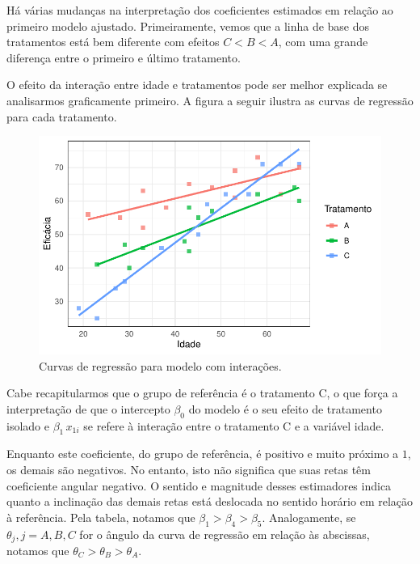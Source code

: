 \documentclass[
  letterpaper,
  DIV=11,
  numbers=noendperiod]{scrartcl}
\begin{document}
Há várias mudanças na interpretação dos coeficientes estimados em
relação ao primeiro modelo ajustado. Primeiramente, vemos que a linha de
base dos tratamentos está bem diferente com efeitos \(C<B<A\), com uma
grande diferença entre o primeiro e último tratamento.

O efeito da interação entre idade e tratamentos pode ser melhor
explicada se analisarmos graficamente primeiro. A figura a seguir
ilustra as curvas de regressão para cada tratamento.

\begin{figure}

{\centering \includegraphics{lista2_files/figure-pdf/unnamed-chunk-1-1.pdf}

}

\caption{Curvas de regressão para modelo com interações.}

\end{figure}

Cabe recapitularmos que o grupo de referência é o tratamento C, o que
força a interpretação de que o intercepto \(\beta_0\) do modelo é o seu
efeito de tratamento isolado e \(\beta_1 \, x_{1i}\) se refere à
interação entre o tratamento C e a variável idade.

Enquanto este coeficiente, do grupo de referência, é positivo e muito
próximo a \(1\), os demais são negativos. No entanto, isto não significa
que suas retas têm coeficiente angular negativo. O sentido e magnitude
desses estimadores indica quanto a inclinação das demais retas está
deslocada no sentido horário em relação à referência. Pela tabela,
notamos que \(\beta_1 > \beta_4 > \beta_5\). Analogamente, se
\(\theta_j, j = A, B, C\) for o ângulo da curva de regressão em relação
às abscissas, notamos que \(\theta_C > \theta_B > \theta_A\).
\end{document}
